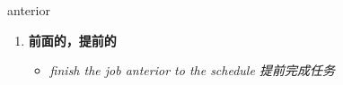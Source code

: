 
\begin{frame}
{\huge anterior}
\begin{center}
\begin{enumerate}\Large
  \item \textbf{前面的，提前的}
  \begin{itemize}
    \item \em{\Large{finish the job anterior to the schedule 提前完成任务}}
  \end{itemize}
\end{enumerate}
\end{center}
\end{frame}
